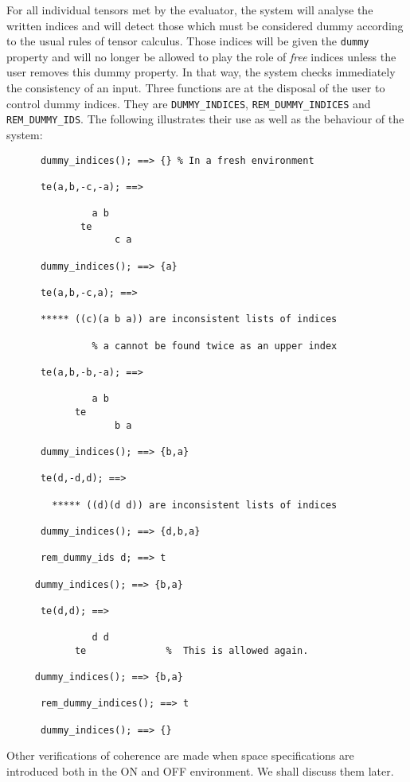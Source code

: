
For all individual tensors met by the evaluator, the system will analyse
the written indices and will detect those which must be considered dummy
according to the usual rules of tensor calculus. Those indices will be given
the \texttt{dummy} property and will no longer be allowed to play the role
of \emph{free} indices unless the user removes this dummy property.
In that way, the system checks immediately the consistency of an input.
Three functions are at the disposal of the user to control dummy indices.
They are \texttt{DUMMY\_INDICES},
\texttt{REM\_DUMMY\_INDICES} and
\texttt{REM\_DUMMY\_IDS}.
The following illustrates their use as well as the behaviour of the
system:
\begin{verbatim}
      dummy_indices(); ==> {} % In a fresh environment

      te(a,b,-c,-a); ==>

               a b
             te
                   c a

      dummy_indices(); ==> {a}

      te(a,b,-c,a); ==>

      ***** ((c)(a b a)) are inconsistent lists of indices

               % a cannot be found twice as an upper index

      te(a,b,-b,-a); ==>

               a b
            te
                   b a

      dummy_indices(); ==> {b,a}

      te(d,-d,d); ==>

        ***** ((d)(d d)) are inconsistent lists of indices

      dummy_indices(); ==> {d,b,a}

      rem_dummy_ids d; ==> t

     dummy_indices(); ==> {b,a}

      te(d,d); ==>

               d d
            te              %  This is allowed again.

     dummy_indices(); ==> {b,a}

      rem_dummy_indices(); ==> t

      dummy_indices(); ==> {}
\end{verbatim}
Other verifications of coherence are made when space specifications
are introduced both in the ON and OFF  environment. We shall
discuss them later.

